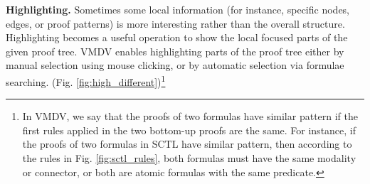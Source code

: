 \documentclass[runningheads]{llncs}
\newcommand\tool[1]{\textsf{#1}}
\newcommand\vmdv{\tool{VMDV}}
\begin{document}
\hspace{-0.48cm}
{\bf Highlighting.}
Sometimes some local information (for instance, specific nodes, edges, or proof patterns) is more interesting rather than the overall structure. Highlighting becomes a useful operation to show the local focused parts of the given proof tree. \vmdv{} enables highlighting parts of the proof tree either by manual selection using mouse clicking, or by automatic selection via formulae searching. (Fig. \ref{fig:high_different})\footnote{In \vmdv{}, we say that the proofs of two formulas have similar pattern if the first rules applied in the two bottom-up proofs are the same. For instance, if the proofs of two formulas in \textsf{SCTL} have similar pattern, then according to the rules in Fig. \ref{fig:sctl_rules}, both formulas must have the same modality or connector, or both are atomic formulas with the same predicate.}
\smallskip

 
\end{document}

